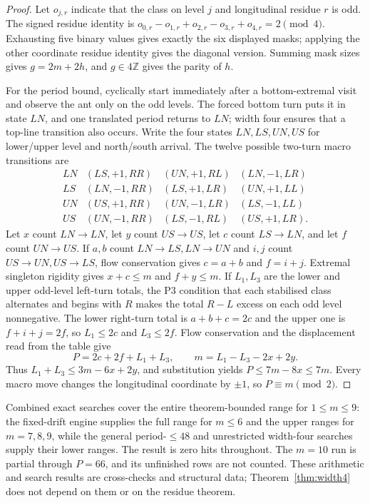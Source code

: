 \documentclass[11pt,reqno]{amsart}
\theoremstyle{plain}
\theoremstyle{definition}
\newcommand{\Z}{\mathbb{Z}}
\begin{document}
\begin{proof}
Let $o_{j,r}$ indicate that the class on level $j$ and longitudinal residue $r$ is
odd.  The signed residue identity is
$o_{0,r}-o_{1,r}+o_{2,r}-o_{3,r}+o_{4,r}=2\pmod4$.
Exhausting five binary values gives exactly the six displayed masks; applying the
other coordinate residue identity gives the diagonal version.  Summing mask sizes
gives $g=2m+2h$, and $g\in4\Z$ gives the parity of $h$.

For the period bound, cyclically start immediately after a bottom-extremal visit and
observe the ant only on the odd levels.  The forced bottom turn puts it in state
$LN$, and one translated period returns to $LN$; width four ensures that a top-line
transition also occurs.  Write the four states
$LN,LS,UN,US$ for lower/upper level and north/south arrival.  The twelve possible
two-turn macro transitions are
\[
\begin{array}{c|ccc}
LN&(LS,+1,RR)&(UN,+1,RL)&(LN,-1,LR)\\
LS&(LN,-1,RR)&(LS,+1,LR)&(UN,+1,LL)\\
UN&(US,+1,RR)&(UN,-1,LR)&(LS,-1,LL)\\
US&(UN,-1,RR)&(LS,-1,RL)&(US,+1,LR).
\end{array}
\]
Let $x$ count $LN\to LN$, let $y$ count $US\to US$, let $c$ count $LS\to LN$,
and let $f$ count $UN\to US$.  If $a,b$ count $LN\to LS,LN\to UN$ and $i,j$
count $US\to UN,US\to LS$, flow conservation gives $c=a+b$ and $f=i+j$.
Extremal singleton rigidity gives $x+c\le m$ and $f+y\le m$.  If $L_1,L_3$ are
the lower and upper odd-level left-turn totals, the P3 condition that each
stabilised class alternates and begins with $R$ makes the total $R-L$ excess on
each odd level nonnegative.  The lower right-turn total is $a+b+c=2c$ and the
upper one is $f+i+j=2f$, so $L_1\le2c$ and $L_3\le2f$.  Flow conservation and
the displacement read from the table give
\[
P=2c+2f+L_1+L_3,\qquad m=L_1-L_3-2x+2y.
\]
Thus $L_1+L_3\le3m-6x+2y$, and substitution yields
$P\le7m-8x\le7m$.  Every macro move changes the longitudinal coordinate by
$\pm1$, so $P\equiv m\pmod2$.
\end{proof}

Combined exact searches cover the entire theorem-bounded range for $1\le m\le9$:
the fixed-drift engine supplies the
full range for $m\le6$ and the upper ranges for $m=7,8,9$, while the general
period-$\le48$ and unrestricted width-four searches supply their lower ranges.  The
result is zero hits throughout.  The $m=10$ run is
partial through $P=66$, and its unfinished rows are not counted.  These arithmetic
and search results are cross-checks and structural data; Theorem~\ref{thm:width4}
does not depend on them or on the residue theorem.
\end{document}
